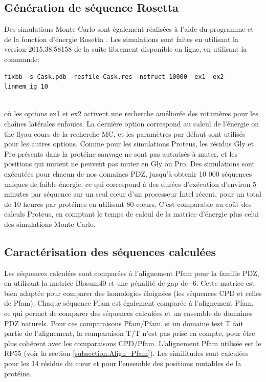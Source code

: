 \subsection{Génération de séquence Rosetta}

Des simulations Monte Carlo sont également réalisées à l'aide du programme et de la fonction d'énergie Rosetta \cite{Baker06}. Les simulations sont faites en utilisant la version 2015.38.58158 de la suite librement disponible en ligne, en utilisant la commande:\\
\begin{verbatim}
fixbb -s Cask.pdb -resfile Cask.res -nstruct 10000 -ex1 -ex2 -linmem_ig 10
\end{verbatim} \normalsize\\
où les options ex1 et ex2 activent une recherche améliorée des rotamères pour les chaînes latérales enfouies. La dernière option correspond au calcul de l'énergie \og on the fly\fg au cours de la recherche MC, et les paramètres par défaut sont utilisés pour les autres options. Comme pour les simulations Proteus, les résidus Gly et Pro présents dans la protéine sauvage ne sont pas autorisés à muter, et les positions qui mutent ne peuvent pas muter en Gly ou Pro. Des simulations sont exécutées pour chacun de nos domaines PDZ, jusqu'à obtenir 10 000 séquences uniques de faible énergie, ce qui correspond à des durées d'exécution d'environ 5 minutes par séquence sur un seul cœur d'un processeur Intel récent, pour un total de 10 heures par protéines en utilisant 80 cœurs. C'est comparable au coût des calculs Proteus, en comptant le temps de calcul de la matrice d'énergie plus celui des simulations Monte Carlo.

\subsection{Caractérisation des séquences calculées}

Les séquences calculées sont comparées à l'alignement Pfam pour la famille PDZ, en utilisant la matrice Blosum40 et une pénalité de gap de -6. Cette matrice est bien adaptée pour comparer des homologies éloignées (les séquences CPD et celles de Pfam). Chaque séquence Pfam est également comparée à l'alignement Pfam, ce qui permet de comparer des séquences calculées et un ensemble de domaines PDZ naturels. Pour ces comparaisons Pfam/Pfam, si un domaine test T fait partie de l'alignement, la comparaison T/T n'est pas prise en compte, pour être plus cohérent avec les comparaisons CPD/Pfam. L'alignement Pfam utilisée est le \og RP55 \fg (voir la section \ref{subsection:Align_Pfam}). Les similitudes sont calculées pour les 14 résidus du cœur et pour l'ensemble des positions mutables de la protéine.

